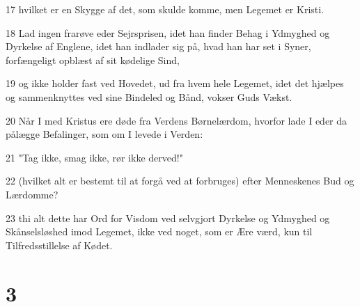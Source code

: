 \par 17 hvilket er en Skygge af det, som skulde komme, men Legemet er Kristi.
\par 18 Lad ingen frarøve eder Sejrsprisen, idet han finder Behag i Ydmyghed og Dyrkelse af Englene, idet han indlader sig på, hvad han har set i Syner, forfængeligt opblæst af sit kødelige Sind,
\par 19 og ikke holder fast ved Hovedet, ud fra hvem hele Legemet, idet det hjælpes og sammenknyttes ved sine Bindeled og Bånd, vokser Guds Vækst.
\par 20 Når I med Kristus ere døde fra Verdens Børnelærdom, hvorfor lade I eder da pålægge Befalinger, som om I levede i Verden:
\par 21 "Tag ikke, smag ikke, rør ikke derved!"
\par 22 (hvilket alt er bestemt til at forgå ved at forbruges) efter Menneskenes Bud og Lærdomme?
\par 23 thi alt dette har Ord for Visdom ved selvgjort Dyrkelse og Ydmyghed og Skånselsløshed imod Legemet, ikke ved noget, som er Ære værd, kun til Tilfredsstillelse af Kødet.

\chapter{3}

